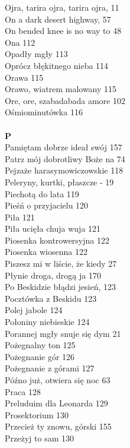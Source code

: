 \documentclass[a5paper, 10pt]{book}
\begin{document}
{\begin{multicols}{3}
    Ojra, tarira ojra, tarira ojra, 11\\
    On a dark desert highway, 57\\
    On bended knee is no way to 48\\
    Ona 112\\
    Opadły mgły 113\\
    Oprócz błękitnego nieba 114\\
    Orawa 115\\
    Orawo, wiatrem malowany 115\\
    Ore, ore, szabadabada amore 102\\
    Ośmiominutówka 116\\
    \\
    {\footnotesize \textbf{P\\} }
    Pamiętam dobrze ideał swój 157\\
    Patrz mój dobrotliwy Boże na 74\\
    Pejzaże harasymowiczowskie 118\\
    Peleryny, kurtki, płaszcze - 19\\
    Piechotą do lata 119\\
    Pieśń o przyjacielu 120\\
    Piła 121\\
    Piła ucięła chuja wuja 121\\
    Piosenka kontrowersyjna 122\\
    Piosenka wiosenna 122\\
    Piszesz mi w liście, że kiedy 27\\
    Płynie droga, drogą ja 170\\
    Po Beskidzie błądzi jesień, 123\\
    Pocztówka z Beskidu 123\\
    Polej jabole 124\\
    Połoniny niebieskie 124\\
    Porannej mgły snuje się dym 21\\
    Pożegnalny ton 125\\
    Pożegnanie gór 126\\
    Pożegnanie z górami 127\\
    Późno już, otwiera się noc 63\\
    Praca 128\\
    Preluduim dla Leonarda 129\\
    Prosektorium 130\\
    Przecież ty znowu, górski 155\\
    Przeżyj to sam 130\\

\end{multicols}}
\end{document}
